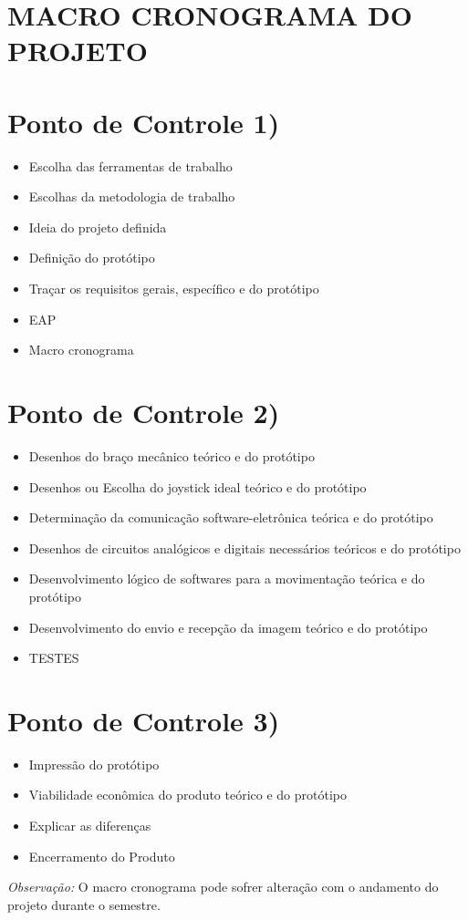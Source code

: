 \section{MACRO CRONOGRAMA DO PROJETO}

\section*{Ponto de Controle 1)}
\begin{itemize}
\item Escolha das ferramentas de trabalho
\item Escolhas da metodologia de trabalho
\item Ideia do projeto definida
\item Definição do protótipo
\item Traçar os requisitos gerais, específico e do protótipo
\item EAP 
\item Macro cronograma
\end{itemize}

\section*{Ponto de Controle 2)}
\begin{itemize}
\item Desenhos do braço mecânico teórico e do protótipo
\item Desenhos ou Escolha do joystick ideal teórico e do protótipo
\item Determinação da comunicação software-eletrônica teórica e do protótipo
\item Desenhos de circuitos analógicos e digitais necessários teóricos e do protótipo
\item Desenvolvimento lógico de softwares para a movimentação teórica e do protótipo
\item Desenvolvimento do envio e recepção da imagem teórico e do protótipo
\item TESTES
\end{itemize}

\section*{Ponto de Controle 3)}
\begin{itemize}
\item Impressão do protótipo
\item Viabilidade econômica do produto teórico e do protótipo
\item Explicar as diferenças
\item Encerramento do Produto
\end{itemize}

\noindent\textit{Observação:} O macro cronograma pode sofrer alteração com o andamento do projeto durante o semestre.